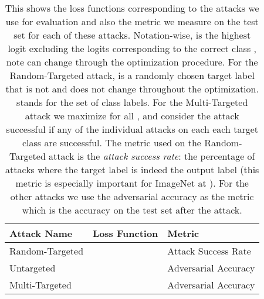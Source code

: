 \documentclass{article}
\theoremstyle{plain}
\theoremstyle{definition}
\theoremstyle{remark}
\begin{document}
\begin{table}[htb]
    \centering
    \begin{tabular}{p{3.0cm}||p{6cm}|p{3cm}}
{\bf Attack Name}   &  {\bf Loss Function} & {\bf Metric}\\\hline
       Random-Targeted  &  & Attack Success Rate\\
Untargeted &   & Adversarial Accuracy\\
Multi-Targeted &  & Adversarial Accuracy 
    \end{tabular}
    \vspace{0.2cm}
    \caption{\small{This shows the loss functions corresponding to the attacks we use for evaluation and also the metric we measure on the test set for each of these attacks. Notation-wise,  is the highest logit excluding the logits corresponding to the correct class , note  can change through the optimization procedure. For the Random-Targeted attack,  is a randomly chosen target label that is not  and does not change throughout the optimization.  stands for the set of class labels. For the Multi-Targeted attack we maximize  for all , and consider the attack successful if any of the individual attacks on each each target class  are successful. The metric used on the Random-Targeted attack is the {\it attack success rate}: the percentage of attacks where the target label  is indeed the output label (this metric is especially important for ImageNet at ). For the other attacks we use the adversarial accuracy as the metric which is the accuracy on the test set after the attack.}}\label{tab:different_attacks}
\end{table}
\vspace{-0.5cm}
 
\end{document}
